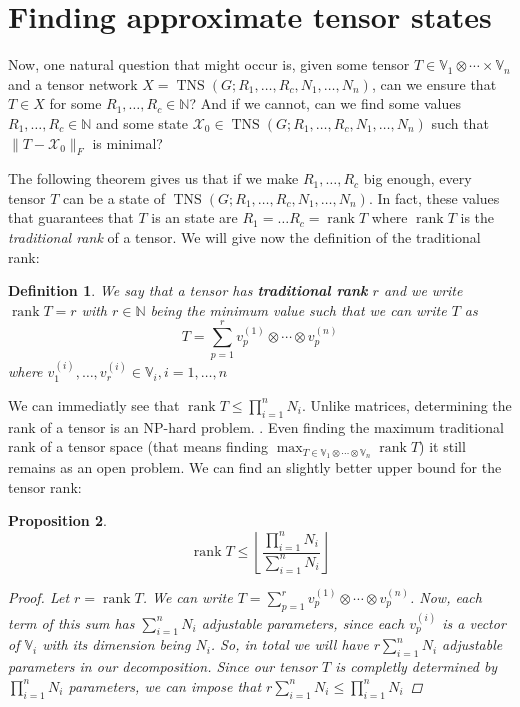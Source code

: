 \documentclass[11pt,a4paper,openright,oneside]{book}
\numberwithin{equation}{section}
\newtheorem{defn0}{Definition}[chapter]
\newtheorem{prop0}[defn0]{Proposition}
\newenvironment{definition}{ \begin{defn0}}{\end{defn0}}
\newenvironment{proposition}{\bigskip \begin{prop0}}{\end{prop0}}
\DeclareMathOperator{\rank}{rank}
\DeclareMathOperator{\TNS}{TNS}
\begin{document}
\section{Finding approximate tensor states}

Now, one natural question that might occur is, given some tensor $T \in \mathbb{V}_1 \otimes \cdots \times \mathbb{V}_n$ and a 
tensor network $X = \TNS(G; R_1, \dots, R_c, N_1, \dots, N_n)$, can we ensure that $T \in X$ for some
$R_1, \dots, R_c \in \mathbb{N}$? And if we cannot, can we find some values $R_1, \dots, R_c \in \mathbb{N}$
and some state $\mathcal{X}_0 \in \TNS(G; R_1, \dots, R_c, N_1, \dots, N_n)$ such that $\| T - \mathcal{X}_0 \|_F$ is minimal?

The following theorem gives us that if we make $R_1, \dots, R_c$ big enough, every tensor $T$ can be a state of $\TNS(G; R_1, \dots, R_c, N_1, \dots, N_n)$.
In fact, these values that guarantees that $T$ is an state are $R_1 = \dots R_c = \rank T$ where $\rank T$ is the \textit{traditional rank}
of a tensor. We will give now the definition of the traditional rank:

\begin{definition} 
    We say that a tensor has \textbf{traditional rank} $r$ and we write $\rank{T} = r$
    with $r \in \mathbb{N}$ being the minimum value such that we can write $T$ as
$$T= \sum_{p=1}^r v_p^{(1)} \otimes \cdots \otimes v_p^{(n)}$$
where $v_1^{(i)}, \dots, v_r^{(i)} \in \mathbb{V}_i, i = 1, \dots, n$
\end{definition}

We can immediatly see that $\rank{T} \leqslant \prod_{i=1}^n N_i$.
Unlike matrices, determining the rank of a tensor is an NP-hard problem. \cite{hillarMostTensorProblems2013}. Even
finding the maximum traditional rank of a tensor space (that means finding $\max_{T \in \mathbb{V}_1 \otimes \cdots \otimes \mathbb{V}_n} \rank{T}$) it still remains as an open problem.
We can find an slightly better upper bound for the tensor rank:
\begin{proposition}
    \begin{equation} \label{eq:rank-dimensional-bound}
        \rank{T} \leqslant \left\lfloor \frac{\prod_{i=1}^n N_i}{\sum_{i=1}^n N_i} \right\rfloor
    \end{equation}

\begin{proof}
    Let $r = \rank{T}$. We can write $T = \sum_{p=1}^r v_p^{(1)} \otimes \cdots \otimes v_p^{(n)}$. Now, each term of this
    sum has $\sum_{i=1}^n N_i$ adjustable parameters, since each $v_p^{(i)}$ is a vector of $\mathbb{V}_i$ with its dimension being $N_i$.
    So, in total we will have $r \sum_{i=1}^n N_i$ adjustable parameters in our decomposition. Since our tensor $T$ is completly
    determined by $\prod_{i=1}^n N_i$ parameters, we can impose that $r \sum_{i=1}^n N_i \leqslant \prod_{i=1}^n N_i$ 
\end{proof}
\end{proposition}
\end{document}
